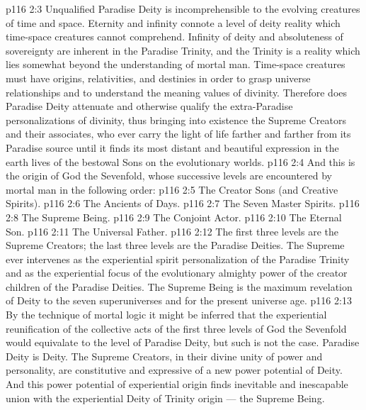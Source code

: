 \vs p116 2:3 \pc Unqualified Paradise Deity is incomprehensible to the evolving creatures of time and space. Eternity and infinity connote a level of deity reality which time\hyp{}space creatures cannot comprehend. Infinity of deity and absoluteness of sovereignty are inherent in the Paradise Trinity, and the Trinity is a reality which lies somewhat beyond the understanding of mortal man. Time\hyp{}space creatures must have origins, relativities, and destinies in order to grasp universe relationships and to understand the meaning values of divinity. Therefore does Paradise Deity attenuate and otherwise qualify the extra\hyp{}Paradise personalizations of divinity, thus bringing into existence the Supreme Creators and their associates, who ever carry the light of life farther and farther from its Paradise source until it finds its most distant and beautiful expression in the earth lives of the bestowal Sons on the evolutionary worlds.
\vs p116 2:4 And this is the origin of God the Sevenfold, whose successive levels are encountered by mortal man in the following order:
\vs p116 2:5 \bibnobreakspace The Creator Sons (and Creative Spirits).
\vs p116 2:6 \bibnobreakspace The Ancients of Days.
\vs p116 2:7 \bibnobreakspace The Seven Master Spirits.
\vs p116 2:8 \bibnobreakspace The Supreme Being.
\vs p116 2:9 \bibnobreakspace The Conjoint Actor.
\vs p116 2:10 \bibnobreakspace The Eternal Son.
\vs p116 2:11 \bibnobreakspace The Universal Father.
\vs p116 2:12 \pc The first three levels are the Supreme Creators; the last three levels are the Paradise Deities. The Supreme ever intervenes as the experiential spirit personalization of the Paradise Trinity and as the experiential focus of the evolutionary almighty power of the creator children of the Paradise Deities. The Supreme Being is the maximum revelation of Deity to the seven superuniverses and for the present universe age.
\vs p116 2:13 By the technique of mortal logic it might be inferred that the experiential reunification of the collective acts of the first three levels of God the Sevenfold would equivalate to the level of Paradise Deity, but such is not the case. Paradise Deity is  Deity. The Supreme Creators, in their divine unity of power and personality, are constitutive and expressive of a new power potential of  Deity. And this power potential of experiential origin finds inevitable and inescapable union with the experiential Deity of Trinity origin --- the Supreme Being.
